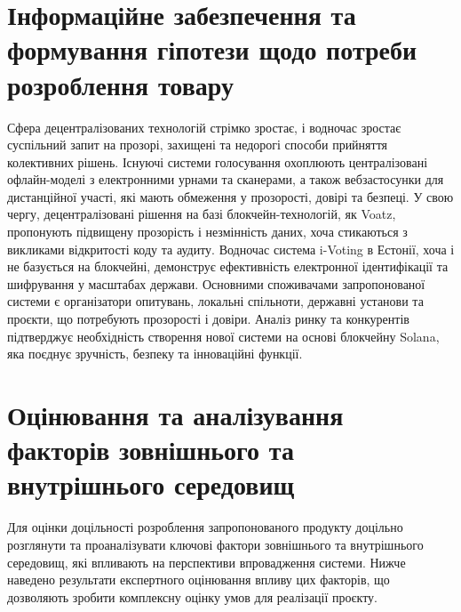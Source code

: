 \documentclass[14pt]{extreport}
\begin{document}
  \section{Інформаційне забезпечення та формування гіпотези щодо потреби розроблення товару}
  
  Сфера децентралізованих технологій стрімко зростає, і водночас зростає суспільний запит на прозорі, захищені та недорогі способи прийняття колективних рішень. Існуючі системи голосування охоплюють централізовані офлайн-моделі з електронними урнами та сканерами, а також вебзастосунки для дистанційної участі, які мають обмеження у прозорості, довірі та безпеці. У свою чергу, децентралізовані рішення на базі блокчейн-технологій, як Voatz, пропонують підвищену прозорість і незмінність даних, хоча стикаються з викликами відкритості коду та аудиту. Водночас система i-Voting в Естонії, хоча і не базується на блокчейні, демонструє ефективність електронної ідентифікації та шифрування у масштабах держави. Основними споживачами запропонованої системи є організатори опитувань, локальні спільноти, державні установи та проєкти, що потребують прозорості і довіри. Аналіз ринку та конкурентів підтверджує необхідність створення нової системи на основі блокчейну Solana, яка поєднує зручність, безпеку та інноваційні функції.
  
  \section{Оцінювання та аналізування факторів зовнішнього та внутрішнього середовищ}
  
  Для оцінки доцільності розроблення запропонованого продукту доцільно розглянути та проаналізувати ключові фактори зовнішнього та внутрішнього середовищ, які впливають на перспективи впровадження системи. Нижче наведено результати експертного оцінювання впливу цих факторів, що дозволяють зробити комплексну оцінку умов для реалізації проєкту.
  
\end{document}
